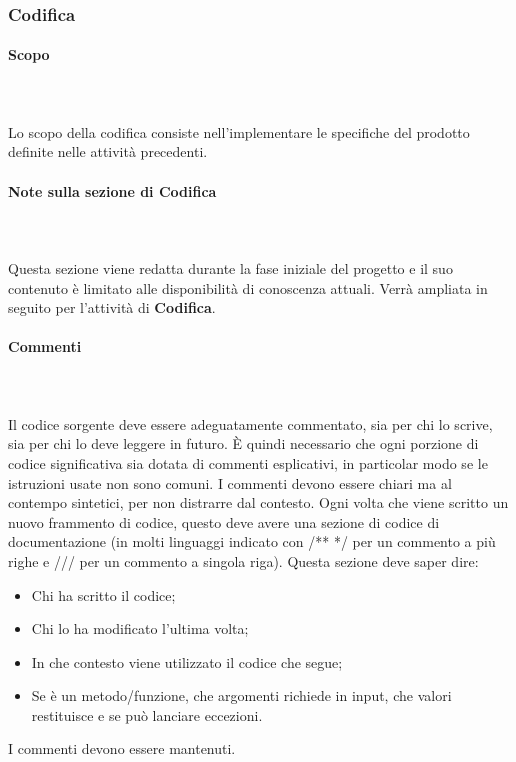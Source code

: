\subsubsection{Codifica}
\paragraph{Scopo}\mbox{}\\ \\
Lo scopo della codifica consiste nell'implementare le specifiche del prodotto definite nelle attività precedenti.

\paragraph{Note sulla sezione di Codifica}\mbox{}\\ \\
Questa sezione viene redatta durante la fase iniziale del progetto e il suo contenuto è limitato alle disponibilità di conoscenza attuali.
Verrà ampliata in seguito per l'attività di \textbf{Codifica}.


\paragraph{Commenti}\mbox{}\\ \\
Il codice sorgente deve essere adeguatamente commentato, sia per chi lo scrive, sia per chi lo deve leggere in futuro.
È quindi necessario che ogni porzione di codice significativa sia dotata di commenti esplicativi, in particolar modo se le istruzioni usate non sono comuni.
I commenti devono essere chiari ma al contempo sintetici, per non distrarre dal contesto.
Ogni volta che viene scritto un nuovo frammento di codice, questo deve avere una sezione di codice di documentazione (in molti linguaggi indicato con /** */ per un commento a più righe e /// per un commento a singola riga).
Questa sezione deve saper dire:
\begin{itemize}
    \item Chi ha scritto il codice;
    \item Chi lo ha modificato l'ultima volta;
    \item In che contesto viene utilizzato il codice che segue;
    \item Se è un metodo/funzione, che argomenti richiede in input, che valori restituisce e se può lanciare eccezioni.
\end{itemize}
I commenti devono essere mantenuti.

